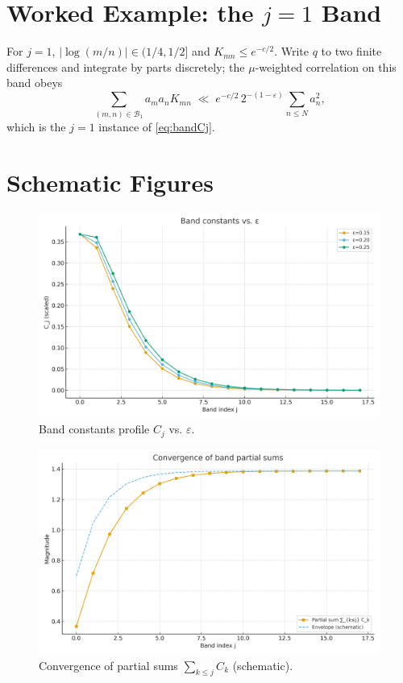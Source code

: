 \documentclass[11pt]{article}
\theoremstyle{remark}
\begin{document}
\section{Worked Example: the $j=1$ Band}
For $j=1$, $|\log(m/n)|\in(1/4,1/2]$ and $K_{mn}\le e^{-c/2}$.
Write $q$ to two finite differences and integrate by parts discretely;
the $\mu$-weighted correlation on this band obeys
\begin{equation}
\sum_{(m,n)\in \mathcal{B}_1} a_m a_n K_{mn}
\;\ll\; e^{-c/2}\,2^{-(1-\varepsilon)} \sum_{n\le N} a_n^2,
\end{equation}
which is the $j=1$ instance of \eqref{eq:bandCj}.

\section{Schematic Figures}
\begin{figure}[h]
\centering
\includegraphics[width=0.75\linewidth]{figures/band_constants_vs_eps.png}
\caption{Band constants profile $C_j$ vs. $\varepsilon$.}
\label{fig:bands-eps}
\end{figure}

\begin{figure}[h]
\centering
\includegraphics[width=0.75\linewidth]{figures/band_partial_sums.png}
\caption{Convergence of partial sums $\sum_{k\le j} C_k$ (schematic).}
\end{figure}
\end{document}
